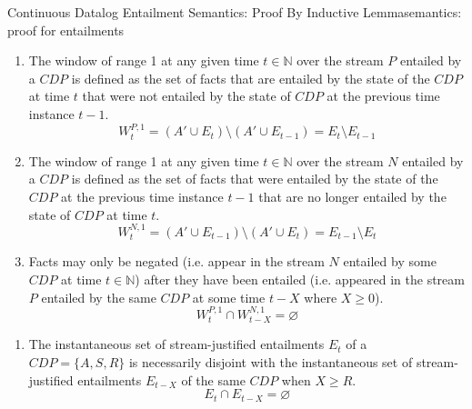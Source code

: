 \begin{nestedsection}{Continuous Datalog Entailment Semantics: Proof By Inductive Lemma}{semantics: proof for entailments}
	\begin{enumerate}\setcounter{enumi}{\thecontinuousDatalogAxioms}
		\item\label{axiom:continuous datalog: positive window increment}
			The window of range 1 at any given time ${t \in \mathbb{N}}$ over the stream $P$ entailed by a ${CDP}$ is defined as the set of facts that are entailed by the state of the ${CDP}$ at time $t$ that were not entailed by the state of ${CDP}$ at the previous time instance ${t-1}$.
			\begin{equation*}
				W^{P,1}_{t} = \left( A' \cup E_{t} \right) \setminus \left( A' \cup E_{t-1} \right) = E_{t} \setminus E_{t-1}
			\end{equation*}
		\item\label{axiom:continuous datalog: negative window increment}
			The window of range 1 at any given time ${t \in \mathbb{N}}$ over the stream $N$ entailed by a ${CDP}$ is defined as the set of facts that were entailed by the state of the ${CDP}$ at the previous time instance ${t-1}$ that are no longer entailed by the state of ${CDP}$ at time $t$.
			\begin{equation*}
				W^{N,1}_{t} = \left( A' \cup E_{t-1} \right) \setminus \left( A' \cup E_{t} \right) = E_{t-1} \setminus E_{t}
			\end{equation*}
		\item\label{axiom:continuous datalog: entailment precedes negation}
			Facts may only be negated (i.e. appear in the stream $N$ entailed by some ${CDP}$ at time ${t \in \mathbb{N}}$) after they have been entailed (i.e. appeared in the stream $P$ entailed by the same ${CDP}$ at some time ${t-X}$ where ${X \geq 0}$).
			\begin{equation*}
				W^{P,1}_{t} \cap W^{N,1}_{t-X} = \varnothing
			\end{equation*}
		\setcounter{continuousDatalogAxioms}{\theenumi}
	\end{enumerate}

	\begin{enumerate}\setcounter{enumi}{\thecontinuousDatalogAxioms}
		\item\label{axiom:continuous datalog: disjoint entailments}
			The instantaneous set of stream-justified entailments $E_t$ of a ${CDP = \{A,S,R\}}$ is necessarily disjoint with the instantaneous set of stream-justified entailments $E_{t-X}$ of the same ${CDP}$ when ${X \geq R}$.
			\begin{equation*}
				E_t \cap E_{t-X} = \varnothing
			\end{equation*}
		\setcounter{continuousDatalogAxioms}{\theenumi}
	\end{enumerate}	


\end{nestedsection}
